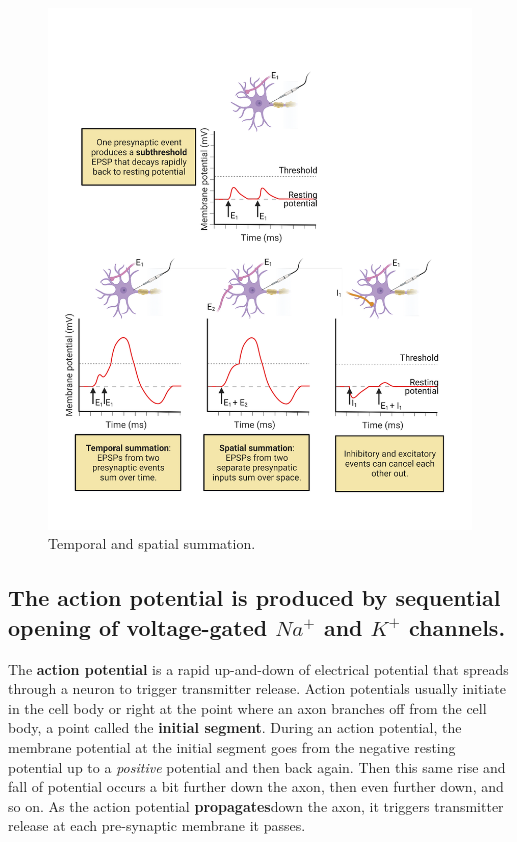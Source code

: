 \documentclass[
]{book}
\begin{document}
\begin{figure}

{\centering \includegraphics[width=0.9\linewidth]{images/ch02/02_23} 

}

\caption{Temporal and spatial summation.}\label{fig:summation}
\end{figure}

\hypertarget{the-action-potential-is-produced-by-sequential-opening-of-voltage-gated-na-and-k-channels.}{%
\subsection{\texorpdfstring{The action potential is produced by sequential opening of voltage-gated \(Na^+\) and \(K^+\) channels.}{The action potential is produced by sequential opening of voltage-gated Na\^{}+ and K\^{}+ channels.}}\label{the-action-potential-is-produced-by-sequential-opening-of-voltage-gated-na-and-k-channels.}}

The \textbf{action potential} is a rapid up-and-down of electrical potential that spreads through a neuron to trigger transmitter release. Action potentials usually initiate in the cell body or right at the point where an axon branches off from the cell body, a point called the \textbf{initial segment}. During an action potential, the membrane potential at the initial segment goes from the negative resting potential up to a \emph{positive} potential and then back again. Then this same rise and fall of potential occurs a bit further down the axon, then even further down, and so on. As the action potential \textbf{propagates}down the axon, it triggers transmitter release at each pre-synaptic membrane it passes.
\end{document}
